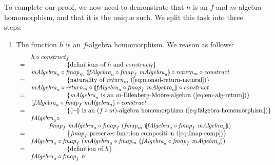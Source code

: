 \documentclass{jfp1}
\newcommand{\fold}[1]{\llparenthesis #1 \rrparenthesis}
\newcommand{\eqAnnotation}[1]{\hspace{2cm}\left\{\textrm{#1}\right\}}
\begin{document}
\begin{proof*}
  To complete our proof, we now need to demonstrate that $h$ is an
  $f$-and-$m$-algebra homomorphism, and that it is the unique such. We
  split this task into three steps:
  \begin{enumerate}
  \item The function $h$ is an $f$-algebra homomorphism. We reason as
    follows:
    \begin{displaymath}
      \begin{array}{cl}
        & h \circ \mathit{construct}_f \\
        =&\eqAnnotation{definitions of $h$ and $\mathit{construct_f}$} \\
         &\mathit{mAlgebra}_a \circ \mathit{fmap}_m~\fold{\mathit{fAlgebra}_a \circ \mathit{fmap}_f~\mathit{mAlgebra}_a} \circ \mathit{return}_m \circ \mathit{construct} \\
        =&\eqAnnotation{naturality of $\mathit{return}_m$ (\autoref{eq:monad-return-natural})} \\
         &\mathit{mAlgebra}_a \circ \mathit{return}_m \circ \fold{\mathit{fAlgebra}_a \circ \mathit{fmap}_f~\mathit{mAlgebra}_a} \circ \mathit{construct} \\
        =&\eqAnnotation{$\mathit{mAlgebra}_a$ is an $m$-Eilenberg-Moore-algebra (\autoref{eq:em-alg-return})} \\
         &\fold{\mathit{fAlgebra}_a \circ \mathit{fmap}_f~\mathit{mAlgebra}_a} \circ \mathit{construct} \\
        =&\eqAnnotation{$\fold{-}$ is an $(f \circ m)$-algebra homomorphism (\autoref{eq:falgebra-homomorphism})} \\
         &\mathit{fAlgebra}_a \circ \\
         & \hspace{1cm}\mathit{fmap}_f~\mathit{mAlgebra}_a \circ \mathit{fmap}_f~(\mathit{fmap}_m~\fold{\mathit{fAlgebra}_a \circ \mathit{fmap}_f~\mathit{mAlgebra}_a}) \\
        =&\eqAnnotation{$\mathit{fmap}_f$ preserves function composition (\autoref{eq:fmap-comp})} \\
         &\mathit{fAlgebra}_a \circ \mathit{fmap}_f~(\mathit{mAlgebra}_a \circ \mathit{fmap_m}~\fold{\mathit{fAlgebra}_a \circ \mathit{fmap}_f~\mathit{mAlgebra}_a}) \\
        =&\eqAnnotation{definition of $h$} \\
         & \mathit{fAlgebra}_a \circ \mathit{fmap}_f~h
      \end{array}
    \end{displaymath}

\end{enumerate}
\end{proof*}
\end{document}

